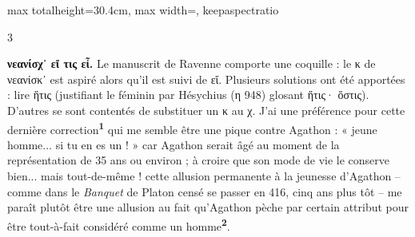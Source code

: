 \documentclass[11pt,twoside]{book}
\newcommand{\italique}[1]{\textit{#1}}
\newcommand{\marqueur}[1]{\textsuperscript{\color{rubricRed}\textbf{#1}}}
\begin{document}
\begin{adjustbox}{max totalheight=30.4cm, max width=\textwidth, keepaspectratio}
\begin{minipage}{\textwidth}
{\begin{multicols}{3}
\par\vspace{1.5pt}
 \textbf{νεανίσχ᾽ εἴ τις εἶ.} Le manuscrit de Ravenne comporte une coquille : le κ de νεανίσκ᾽ est aspiré alors qu'il est suivi de εἴ. Plusieurs solutions ont été apportées : lire ἥτις (justifiant le féminin par Hésychius (η 948) glosant ἥτις· ὅστις). D'autres se sont contentés de substituer un κ au χ. J'ai une préférence pour cette dernière correction\marqueur{1} qui me semble être une pique contre Agathon : « jeune homme... si tu en es un ! » car Agathon serait âgé au moment de la représentation de 35 ans ou environ ; à croire que son mode de vie le conserve bien... mais tout-de-même ! cette allusion permanente à la jeunesse d'Agathon – comme dans le \italique{Banquet} de Platon censé se passer en 416, cinq ans plus tôt – me paraît plutôt être une allusion au fait qu'Agathon pèche par certain attribut pour être tout-à-fait considéré comme un homme\marqueur{2}.
\par\vspace{1.5pt}

\end{multicols}}
\end{minipage}
\end{adjustbox}
\end{document}
